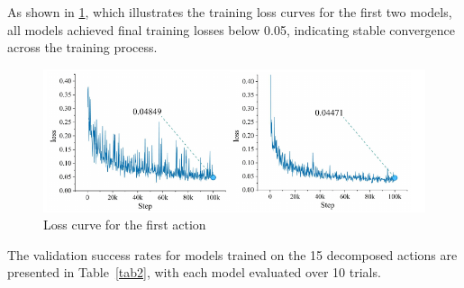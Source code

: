 \documentclass[runningheads]{llncs}
\begin{document}
As shown in \cref{fig14}, which illustrates the training loss curves for the first two models, all models achieved final training losses below 0.05, indicating stable convergence across the training process.


\begin{figure}
\centering
\includegraphics[width=323pt]{fig15.pdf}
\caption{  Loss curve for the first action} \label{fig14}
\end{figure}


The validation success rates for models trained on the 15 decomposed actions are presented in Table~\ref{tab2}, with each model evaluated over 10 trials.
\end{document}
